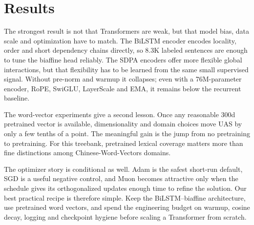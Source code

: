\section{Results}
\label{sec:results}

The strongest result is not that Transformers are weak, but that model bias, data scale and optimization have to match. The BiLSTM encoder encodes locality, order and short dependency chains directly, so 8.3K labeled sentences are enough to tune the biaffine head reliably. The SDPA encoders offer more flexible global interactions, but that flexibility has to be learned from the same small supervised signal. Without pre-norm and warmup it collapses; even with a 76M-parameter encoder, RoPE, SwiGLU, LayerScale and EMA, it remains below the recurrent baseline.

The word-vector experiments give a second lesson. Once any reasonable 300d pretrained vector is available, dimensionality and domain choices move UAS by only a few tenths of a point. The meaningful gain is the jump from no pretraining to pretraining. For this treebank, pretrained lexical coverage matters more than fine distinctions among Chinese-Word-Vectors domains.

The optimizer story is conditional as well. Adam is the safest short-run default, SGD is a useful negative control, and Muon becomes attractive only when the schedule gives its orthogonalized updates enough time to refine the solution. Our best practical recipe is therefore simple. Keep the BiLSTM--biaffine architecture, use pretrained word vectors, and spend the engineering budget on warmup, cosine decay, logging and checkpoint hygiene before scaling a Transformer from scratch.

